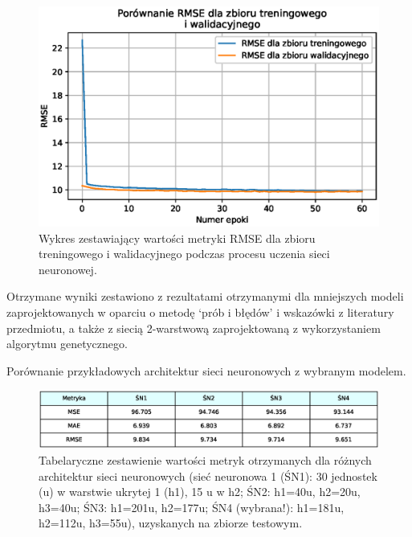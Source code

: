 \documentclass[a4paper,12pt]{article}
\numberwithin{figure}{section}
\begin{document}
    \smallskip

    \begin{figure}[H]
        \centering
        \includegraphics[width=\textwidth]{f_m_rmse_train_valid}
        \caption{Wykres zestawiający wartości metryki RMSE dla zbioru treningowego i walidacyjnego podczas procesu uczenia sieci neuronowej.}
        \label{fig:f_m_rmse_train_valid}
    \end{figure}

    \bigskip

    Otrzymane wyniki zestawiono z rezultatami otrzymanymi dla mniejszych modeli zaprojektowanych w oparciu o metodę `prób i błędów' i wskazówki z literatury przedmiotu, a także z siecią 2-warstwową zaprojektowaną z wykorzystaniem algorytmu genetycznego.

    \bigskip

    Porównanie przykładowych architektur sieci neuronowych z wybranym modelem.

    \bigskip

    \begin{figure}[H]
        \centering
        \includegraphics[width=\textwidth]{table_metrics_values_comparison}
        \caption{Tabelaryczne zestawienie wartości metryk otrzymanych dla różnych architektur sieci neuronowych (sieć neuronowa 1 (ŚN1): 30 jednostek (u) w warstwie ukrytej 1 (h1), 15 u w h2; ŚN2: h1=40u, h2=20u, h3=40u; ŚN3: h1=201u, h2=177u; ŚN4 (wybrana!): h1=181u, h2=112u, h3=55u), uzyskanych na zbiorze testowym.}
        \label{fig:table_metrics_values_comparison}
    \end{figure}
\end{document}
